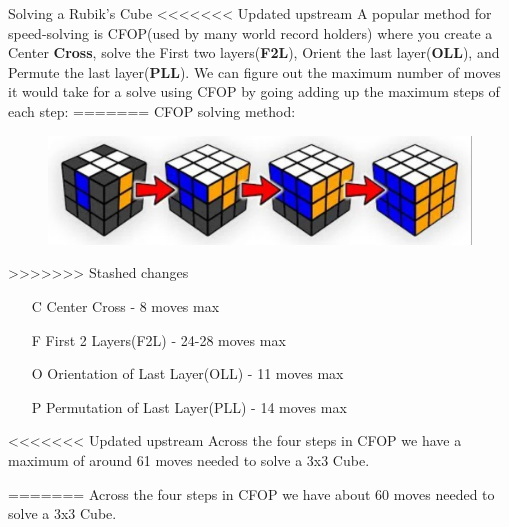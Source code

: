 \documentclass[final]{beamer}
\newlength{\colwidth}
\begin{document}
\begin{frame}[t]
\begin{columns}[t]
\begin{column}{\colwidth}
\begin{block}{Solving a Rubik's Cube}
<<<<<<< Updated upstream
    \large A popular method for speed-solving is CFOP(used by many world record holders) where you create a Center \textbf{Cross}, solve the First two layers(\textbf{F2L}), Orient the last layer(\textbf{OLL}), and Permute the last layer(\textbf{PLL}). 
    We can figure out the maximum number of moves it would take for a solve using CFOP by going adding up the maximum steps of each step: 
=======
    \large CFOP solving method: 
    \begin{figure}
      \centering
      \includegraphics[scale = 2]{logos/CFOP.PNG}
    \end{figure}
>>>>>>> Stashed changes
    \begin{enumerate}
      \item[C] Center Cross - 8 moves max
      \item[F] First 2 Layers(F2L) - 24-28 moves max
      \item[O] Orientation of Last Layer(OLL) - 11 moves max
      \item[P] Permutation of Last Layer(PLL) - 14 moves max
    \end{enumerate}
<<<<<<< Updated upstream
    Across the four steps in CFOP we have a maximum of around 61 moves needed to solve a 3x3 Cube.

=======
    Across the four steps in CFOP we have about 60 moves needed to solve a 3x3 Cube.
    

\end{block}
\end{column}
\end{columns}
\end{frame}
\end{document}
